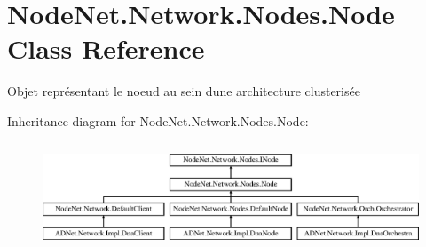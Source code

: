 \hypertarget{class_node_net_1_1_network_1_1_nodes_1_1_node}{}\section{Node\+Net.\+Network.\+Nodes.\+Node Class Reference}
\label{class_node_net_1_1_network_1_1_nodes_1_1_node}


Objet représentant le noeud au sein d\textquotesingle{}une architecture clusterisée  


Inheritance diagram for Node\+Net.\+Network.\+Nodes.\+Node\+:\begin{figure}[H]
\begin{center}
\leavevmode
\includegraphics[height=3.204578cm]{class_node_net_1_1_network_1_1_nodes_1_1_node}
\end{center}
\end{figure}
